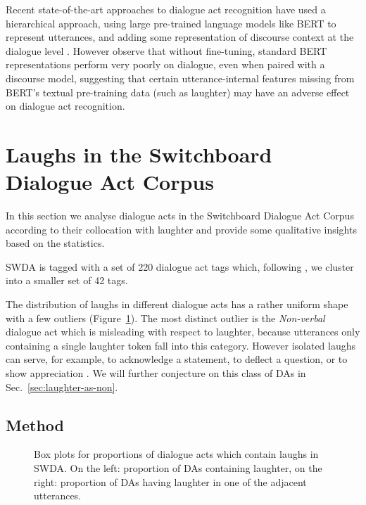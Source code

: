 \documentclass[11pt,a4paper]{article}
\begin{document}
Recent state-of-the-art approaches to dialogue act recognition
have used a hierarchical approach, using large pre-trained language models like BERT to represent utterances, and adding some representation of discourse context at the dialogue level \citep[e.g.,][]{Ribeiro2019,mehriPretrainingMethodsDialog2019}.
However \citet{darbert} observe that without fine-tuning,
standard BERT representations perform very poorly on dialogue,
even when paired with a discourse model,
suggesting that certain utterance-internal features missing
from BERT's textual pre-training data (such as laughter) 
may have an adverse effect on dialogue act recognition.




\section{Laughs in the Switchboard Dialogue Act Corpus}
\label{sec:corpus}

In this section we analyse dialogue acts in the Switchboard Dialogue Act
Corpus according to their collocation with laughter and provide some
qualitative insights based on the statistics.

SWDA is tagged with a set of 220 dialogue act tags which, following
\citet{jurafskySwitchboardSWBDDAMSLShallowDiscourseFunction1997a}, we
cluster into a smaller set of 42 tags.

The distribution of laughs in different dialogue acts has a rather
uniform shape with a few outliers (Figure~\ref{fig:box-swda}). The
most distinct outlier is the \emph{Non-verbal} dialogue act which is
misleading with respect to laughter, because utterances only
containing a single laughter token fall into this category. However
isolated laughs can serve, for example, to acknowledge a statement, to
deflect a question, or to show appreciation
\citep{mazzocconi2019phd}. We will further conjecture on this class of
DAs in Sec.~\ref{sec:laughter-as-non}.

\subsection{Method}
\label{sec:method}

\begin{figure}
    \fontsize{8}{10}\selectfont
  
  \caption{Box plots for proportions of dialogue acts which contain laughs in SWDA. On the left: proportion of DAs containing laughter, on the right: proportion of DAs having laughter in one of the adjacent utterances.}%
  \label{fig:box-swda}
\end{figure}
\end{document}
